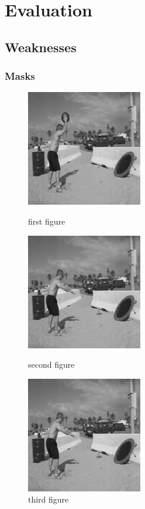 \section{Evaluation}
\label{sec:Evaluation}
\subsection{Weaknesses}
\label{sec:Weaknesses}
\subsubsection{Masks}
\label{sec:MasksWeaknesses}

\begin{figure}
\centering
\begin{minipage}{0.33\textwidth}
\centering
\includegraphics[width=2in]{frame_0074.jpg}
\caption{first figure}
\end{minipage}\hfill
\begin{minipage}{0.33\textwidth}
\centering
\includegraphics[width=2in]{frame_0076.jpg}
\caption{second figure}
\end{minipage}
\begin{minipage}{0.33\textwidth}
\centering
\includegraphics[width=2in]{frame_0076.jpg}
\caption{third figure}
\end{minipage}
\end{figure}

